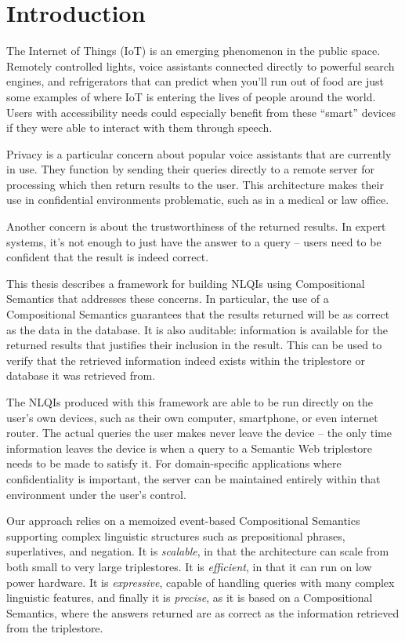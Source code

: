 \documentclass[../main.tex]{subfiles}
\begin{document}
\chapter{Introduction}
\begin{refsection}

\label{chapter:intro}


The Internet of Things (IoT) is an emerging phenomenon in the public space.  Remotely controlled lights,
voice assistants connected directly to powerful search engines, and refrigerators that can predict
when you'll run out of food are just some examples of where IoT is entering the lives of people around the world.  Users with accessibility needs could especially benefit from these ``smart'' devices if they were able to interact with them through speech.

Privacy is a particular concern about popular voice assistants that are currently in use.
They function by sending their queries directly to a remote server for processing which then
return results to the user.  This architecture makes their use in confidential environments problematic,
such as in a medical or law office.

Another concern is about the trustworthiness of the returned results.  In expert systems,
it's not enough to just have the answer to a query -- users need to be confident that the
result is indeed correct.

This thesis describes a framework for building NLQIs using Compositional Semantics that addresses these concerns.  In particular, the use of a Compositional Semantics
guarantees that the results returned will be as correct as the data in the database.
It is also auditable: information is available for the returned results that justifies their inclusion in the result.  This can be used to verify that the retrieved information indeed exists within the triplestore or database it was retrieved from.

The NLQIs produced with this framework are able to be run directly on the user's own devices,
such as their own computer, smartphone, or even internet router.  The actual queries the user
makes never leave the device -- the only time information leaves the device is when a query to
a Semantic Web triplestore needs to be made to satisfy it.  For domain-specific applications
where confidentiality is important, the server can be maintained entirely within that environment
under the user's control.

Our approach relies on a memoized event-based Compositional Semantics supporting complex linguistic structures such as prepositional phrases, superlatives, and negation.  It is \textit{scalable}, in that
the architecture can scale from both small to very large triplestores.  It is \textit{efficient}, in that
it can run on low power hardware.  It is \textit{expressive}, capable of handling queries with many complex linguistic features, and finally it is \textit{precise}, as it is based on a Compositional Semantics,
where the answers returned are as correct as the information retrieved from the triplestore.



\end{refsection}
\end{document}
